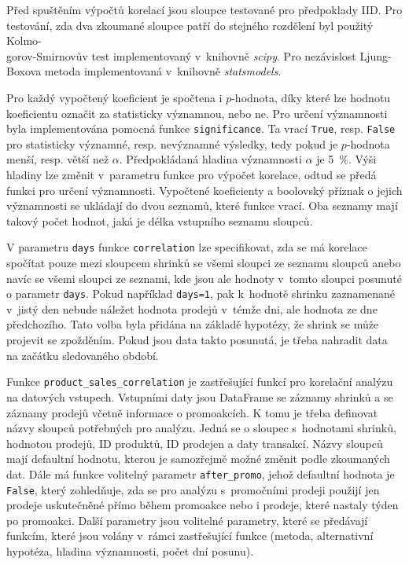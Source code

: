 Před spuštěním výpočtů korelací jsou sloupce testované pro předpoklady IID. Pro testování, zda dva zkoumané sloupce patří do stejného rozdělení byl použitý Kolmo-\\gorov-Smirnovův test implementovaný v~knihovně \emph{scipy}. Pro nezávislost Ljung-Boxova metoda implementovaná v~knihovně \emph{statsmodels}.

Pro každý vypočtený koeficient je spočtena i $p$-hodnota, díky které lze hodnotu koeficientu označit za statisticky významnou, nebo ne. Pro určení významnosti byla implementována pomocná funkce \texttt{significance}. Ta vrací \texttt{True}, resp. \texttt{False} pro statisticky významné, resp. nevýznamné výsledky, tedy pokud je $p$-hodnota menší, resp. větší než $\alpha$. Předpokládaná hladina významnosti $\alpha$ je 5~\%. Výši hladiny lze změnit v~parametru funkce pro výpočet korelace, odtud se předá funkci pro určení významnosti. Vypočtené koeficienty a boolovský příznak o jejich významnosti se ukládají do dvou seznamů, které funkce vrací. Oba seznamy mají takový počet hodnot, jaká je délka vstupního seznamu sloupců.

V parametru \texttt{days} funkce \texttt{correlation} lze specifikovat, zda se má  korelace spočítat pouze mezi sloupcem shrinků se všemi sloupci ze seznamu sloupců anebo navíc se všemi sloupci ze seznami, kde jsou ale hodnoty v~tomto sloupci posunuté o parametr \texttt{days}. Pokud například \texttt{days=1}, pak k~hodnotě shrinku zaznamenané v~jistý den nebude náležet hodnota prodejů v~témže dni, ale hodnota ze dne předchozího. Tato volba byla přidána na základě hypotézy, že shrink se může projevit se zpožděním. Pokud jsou data takto posunutá, je třeba nahradit data na začátku sledovaného období. 

Funkce \texttt{product\_sales\_correlation} je zastřešující funkcí pro korelační analýzu na datových vstupech. Vstupními daty jsou DataFrame se záznamy shrinků a se záznamy prodejů včetně informace o promoakcích. K tomu je třeba definovat názvy  sloupců potřebných pro analýzu. Jedná se o sloupec s~hodnotami shrinků, hodnotou prodejů, ID produktů, ID prodejen a daty transakcí. Názvy sloupců mají defaultní hodnotu, kterou je samozřejmě možné změnit podle zkoumaných dat. Dále má funkce volitelný parametr \texttt{after\_promo}, jehož defaultní hodnota je \texttt{False}, který zohledňuje, zda se pro analýzu s~promočními prodeji použijí jen prodeje uskutečněné přímo během promoakce nebo i prodeje, které nastaly týden po promoakci. Další parametry jsou volitelné parametry, které se předávají funkcím, které jsou volány v~rámci zastřešující funkce (metoda, alternativní hypotéza, hladina významnosti, počet dní posunu). 

